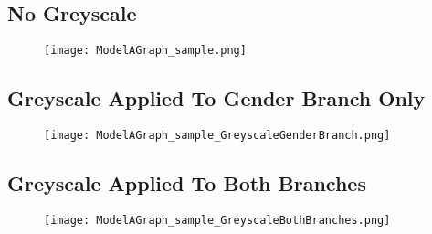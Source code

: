 \subsection*{No Greyscale}
\begin{figure}[h!]
    \centering
    \texttt{[image: ModelAGraph\_sample.png]}
\end{figure}
\newpage

\subsection*{Greyscale Applied To Gender Branch Only}
\begin{figure}[h!]
    \centering
    \texttt{[image: ModelAGraph\_sample\_GreyscaleGenderBranch.png]}
\end{figure}
\newpage

\subsection*{Greyscale Applied To Both Branches}
\begin{figure}[h!]
    \centering
    \texttt{[image: ModelAGraph\_sample\_GreyscaleBothBranches.png]}
\end{figure}
\newpage
